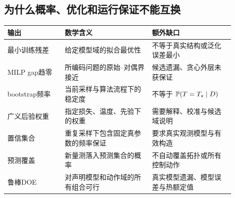 \subsection{为什么概率、优化和运行保证不能互换}
\begin{longtable}{p{0.23\linewidth}p{0.35\linewidth}p{0.33\linewidth}}
\toprule 输出 & 数学含义 & 额外缺口\\\midrule\endhead
最小训练残差 & 给定模型域的拟合最优性 & 不等于真实结构或泛化误差最小\\
MILP gap趋零 & 所编码问题的原始--对偶界接近 & 候选遗漏、贪心外层未获保证\\
bootstrap频率 & 当前采样与算法流程下的稳定度 & 不等于 $\mathbb{P}(T=T_\star\mid D)$\\
广义后验权重 & 指定损失、温度、先验下的权重 & 需要解释、校准与候选域说明\\
置信集合 & 重复采样下包含固定真参数的频率保证 & 要求真实观测模型与有效构造\\
预测覆盖 & 新量测落入预测集合的概率 & 不自动覆盖拓扑或所有控制动作\\
鲁棒DOE & 对声明模型和动作域的所有组合可行 & 真实模型遗漏、模型误差与热额定值\\
\bottomrule
\end{longtable}

